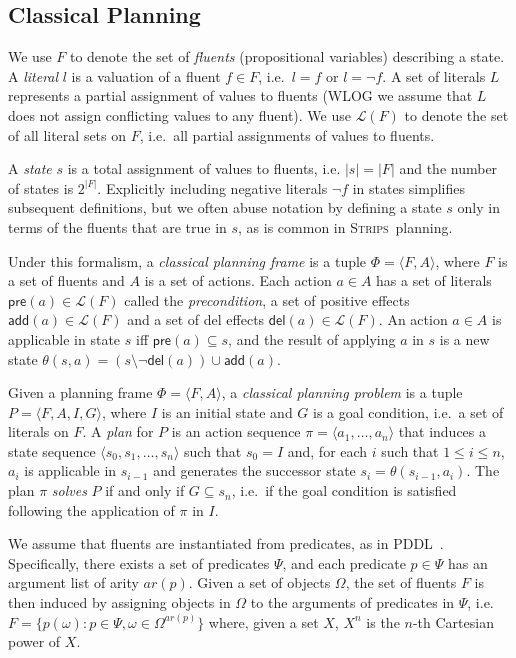 \documentclass[letterpaper]{article} %
\newcommand{\tup}[1]{{\langle #1 \rangle}}
\newcommand{\pre}{\mathsf{pre}}     %
\newcommand{\del}{\mathsf{del}}     %
\newcommand{\add}{\mathsf{add}}     %
\newcommand{\strips}{\textsc{Strips}}     %
\begin{document}
\subsection{Classical Planning}
We use $F$ to denote the set of {\em fluents} (propositional variables) describing a state. A {\em literal} $l$ is a valuation of a fluent $f\in F$, i.e.~$l=f$ or $l=\neg f$. A set of literals $L$ represents a partial assignment of values to fluents (WLOG we assume that $L$ does not assign conflicting values to any fluent). We use $\mathcal{L}(F)$ to denote the set of all literal sets on $F$, i.e.~all partial assignments of values to fluents.

A {\em state} $s$ is a total assignment of values to fluents, i.e. $|s|=|F|$ and the number of states is $2^{|F|}$. Explicitly including negative literals $\neg f$ in states simplifies subsequent definitions, but we often abuse notation by defining a state $s$ only in terms of the fluents that are true in $s$, as is common in \strips\ planning.

Under this formalism, a {\em classical planning frame} is a tuple $\Phi=\tup{F,A}$, where $F$ is a set of fluents and $A$ is a set of actions. Each action $a\in A$ has a set of literals $\pre(a)\in\mathcal{L}(F)$ called the {\em precondition}, a set of positive effects $\add(a)\in\mathcal{L}(F)$ and a set of del effects $\del(a)\in\mathcal{L}(F)$. An action $a\in A$ is applicable in state $s$ iff $\pre(a)\subseteq s$, and the result of applying $a$ in $s$ is a new state $\theta(s,a)=(s\setminus \neg\del(a))\cup\add(a)$.

Given a planning frame $\Phi=\tup{F,A}$, a {\em classical planning problem} is a tuple $P=\tup{F,A,I,G}$, where $I$ is an initial state and $G$ is a goal condition, i.e.~a set of literals on $F$. A {\em plan} for $P$ is an action sequence $\pi=\tup{a_1, \ldots, a_n}$ that induces a state sequence $\tup{s_0, s_1, \ldots, s_n}$ such that $s_0=I$ and, for each $i$ such that {\small $1\leq i\leq n$}, $a_i$ is applicable in $s_{i-1}$ and generates the successor state $s_i=\theta(s_{i-1},a_i)$. The plan $\pi$ {\em solves} $P$ if and only if $G\subseteq s_n$, i.e.~if the goal condition is satisfied following the application of $\pi$ in $I$.

We assume that fluents are instantiated from predicates, as in PDDL~\cite{fox2003pddl2}. Specifically, there exists a set of predicates $\Psi$, and each predicate $p\in\Psi$ has an argument list of arity $ar(p)$. Given a set of objects $\Omega$, the set of fluents $F$ is then induced by assigning objects in $\Omega$ to the arguments of predicates in $\Psi$, i.e.~$F=\{p(\omega):p\in\Psi,\omega\in\Omega^{ar(p)}\}$ where, given a set $X$, $X^n$ is the $n$-th Cartesian power of $X$.
\end{document}
